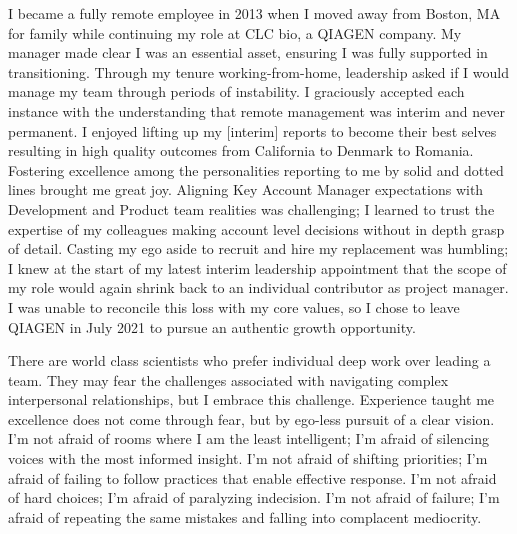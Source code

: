\documentclass[10pt,letterpaper]{article}
\begin{document}
 I became a fully remote employee in 2013 when I moved away from Boston, MA for family while continuing my role at CLC bio, a QIAGEN company. My manager made clear I was an essential asset, ensuring I was fully supported in transitioning. Through my tenure working-from-home, leadership asked if I would manage my team through periods of instability. I graciously accepted each instance with the understanding that remote management was interim and never permanent. I enjoyed lifting up my [interim] reports to become their best selves resulting in high quality outcomes from California to Denmark to Romania. Fostering excellence among the personalities reporting to me by solid and dotted lines brought me great joy. Aligning Key Account Manager expectations with Development and Product team realities was challenging; I learned to trust the expertise of my colleagues making account level decisions without in depth grasp of detail. Casting my ego aside to recruit and hire my replacement was humbling; I knew at the start of my latest interim leadership appointment that the scope of my role would again shrink back to an individual contributor as project manager. I was unable to reconcile this loss with my core values, so I chose to leave QIAGEN in July 2021 to pursue an authentic growth opportunity. 


There are world class scientists who prefer individual deep work over leading a team. They may fear the challenges associated with navigating complex interpersonal relationships, but I embrace this challenge. Experience taught me excellence does not come through fear, but by ego-less pursuit of a clear vision. I\rq{}m not afraid of rooms where I am the least intelligent; I\rq{}m afraid of silencing voices with the most informed insight. I\rq{}m not afraid of shifting priorities; I\rq{}m afraid of failing to follow practices that enable effective response. I\rq{}m not afraid of hard choices; I\rq{}m afraid of paralyzing indecision. I\rq{}m not afraid of failure; I\rq{}m afraid of repeating the same mistakes and falling into complacent mediocrity.
\end{document}
